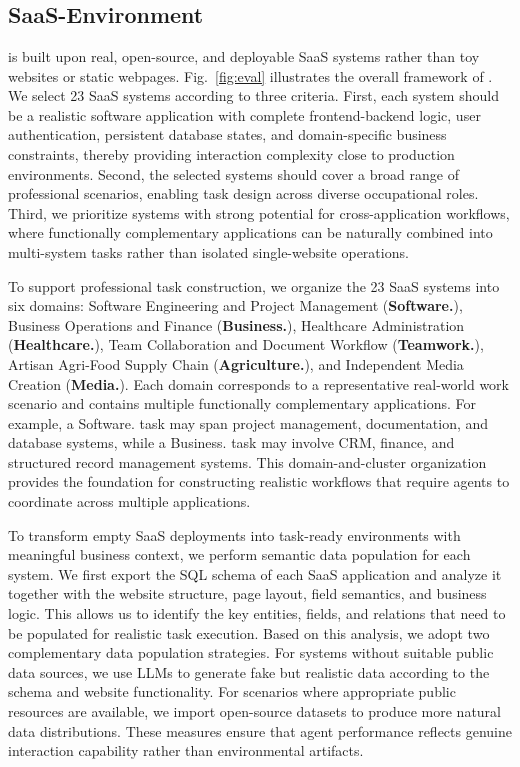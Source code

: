 \section{\datasetname}
\label{saas}



\subsection{SaaS-Environment}
\label{saas-env}

\datasetname is built upon real, open-source, and deployable SaaS systems rather than toy websites or static webpages. Fig.~\ref{fig:eval} illustrates the overall framework of \datasetname. We select 23 SaaS systems according to three criteria. First, each system should be a realistic software application with complete frontend-backend logic, user authentication, persistent database states, and domain-specific business constraints, thereby providing interaction complexity close to production environments. Second, the selected systems should cover a broad range of professional scenarios, enabling task design across diverse occupational roles. Third, we prioritize systems with strong potential for cross-application workflows, where functionally complementary applications can be naturally combined into multi-system tasks rather than isolated single-website operations.

To support professional task construction, we organize the 23 SaaS systems into six domains: Software Engineering and Project Management (\textbf{Software.}), Business Operations and Finance (\textbf{Business.}), Healthcare Administration (\textbf{Healthcare.}), Team Collaboration and Document Workflow (\textbf{Teamwork.}), Artisan Agri-Food Supply Chain (\textbf{Agriculture.}), and Independent Media Creation (\textbf{Media.}). Each domain corresponds to a representative real-world work scenario and contains multiple functionally complementary applications. For example, a Software. task may span project management, documentation, and database systems, while a Business. task may involve CRM, finance, and structured record management systems. This domain-and-cluster organization provides the foundation for constructing realistic workflows that require agents to coordinate across multiple applications.

To transform empty SaaS deployments into task-ready environments with meaningful business context, we perform semantic data population for each system. We first export the SQL schema of each SaaS application and analyze it together with the website structure, page layout, field semantics, and business logic. This allows us to identify the key entities, fields, and relations that need to be populated for realistic task execution. Based on this analysis, we adopt two complementary data population strategies. For systems without suitable public data sources, we use LLMs to generate fake but realistic data according to the schema and website functionality. For scenarios where appropriate public resources are available, we import open-source datasets to produce more natural data distributions. These measures ensure that agent performance reflects genuine interaction capability rather than environmental artifacts.

